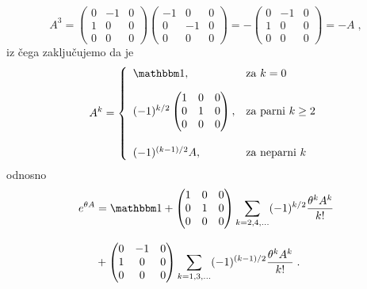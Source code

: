 \begin{equation}
    A^3 =
    \begin{pmatrix}
        0 & -1 & 0 \\
        1 &  0 & 0 \\
        0 &  0 & 0 
    \end{pmatrix}
    \begin{pmatrix}
        -1 & 0 & 0 \\
        0 &  -1 & 0 \\
        0 &  0 & 0 
    \end{pmatrix}  = -
    \begin{pmatrix}
        0 & -1 & 0 \\
        1 &  0 & 0 \\
        0 &  0 & 0 
    \end{pmatrix} = - A \;,
\end{equation}
iz čega zaključujemo da je 
\begin{equation}
    A^k =
    \left\{
        \begin{array}{ll}
            \Eins, & \text{za $k=0$} \\[10pt]
            (-1)^{k/2}\begin{pmatrix}
                1 & 0 & 0 \\
                0 & 1 & 0 \\
                0 & 0 & 0
            \end{pmatrix}, & \text{za parni $k \ge 2$} \\[25pt]
           (-1)^{(k-1)/2} A, & \text{za neparni $k$}
        \end{array}
        \right.
\end{equation}
odnosno
\begin{align}
    e^{\theta A}& =  \Eins + 
            \begin{pmatrix}
                1 & 0 & 0 \\
                0 & 1 & 0 \\
                0 & 0 & 0
            \end{pmatrix} \sum_{k = 2,4,\ldots} (-1)^{k/2} \frac{\theta^k A^k}{k!} \nonumber \\[2ex]
                & + 
            \begin{pmatrix}
                0 & -1 & 0 \\
                1 & 0 & 0 \\
                0 & 0 & 0
            \end{pmatrix} \sum_{k = 1,3,\ldots} (-1)^{(k-1)/2} \frac{\theta^k A^k}{k!} \;.
\end{align}
